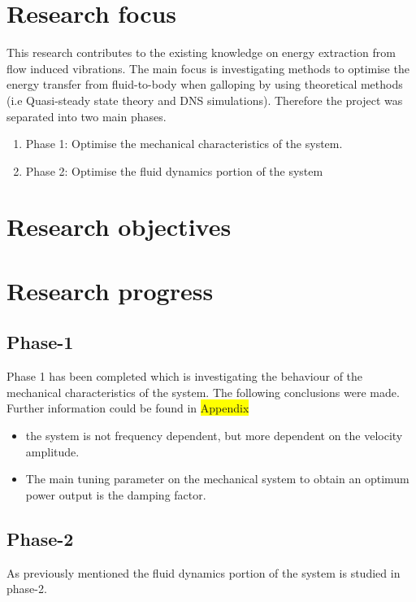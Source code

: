 \documentclass{article}
\newcommand{\hilight}[1]{\colorbox{yellow}{#1}}
\begin{document}
\section{Research focus}
 This research contributes to the existing knowledge on energy extraction from flow induced vibrations. The main focus is investigating methods to optimise the energy transfer from fluid-to-body when galloping by using theoretical methods (i.e Quasi-steady state theory and DNS simulations). Therefore the project was separated into two main phases.
 
\begin{enumerate}[]
\item Phase 1: Optimise the mechanical characteristics of the system.
\item Phase 2: Optimise the fluid dynamics portion of the system 
\end{enumerate}

\section{Research objectives}




\section{Research progress}

\subsection{Phase-1}

Phase 1 has been completed which is investigating the behaviour of the mechanical characteristics of the system. The following conclusions were made. Further information could be found in \hilight{Appendix}

\begin{itemize}
\item   the system is not frequency dependent, but more dependent on the velocity amplitude.
\item The main tuning parameter on the mechanical system to obtain an optimum power output is the damping factor.
\end{itemize}

\subsection{Phase-2}

As previously mentioned the fluid dynamics portion of the system is studied in phase-2.
\end{document}
